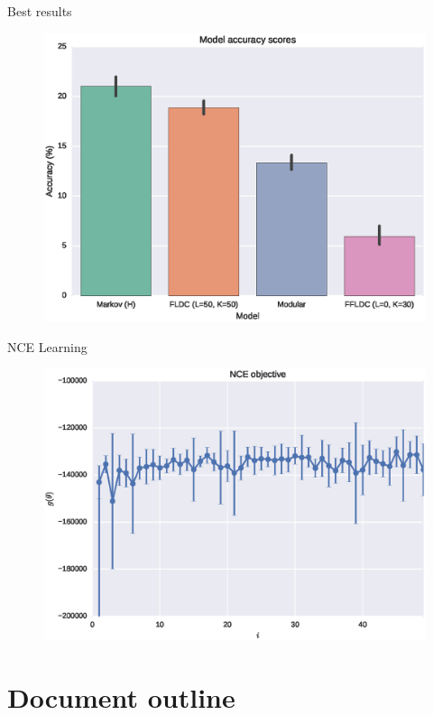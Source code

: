 \documentclass{beamer}
\begin{document}
\begin{frame}{Best results}
  \begin{figure}
    \centering
    \includegraphics[height=0.8\textheight]{score_100_no_singles_with_features}
  \end{figure}
\end{frame}

\begin{frame}{NCE Learning}
  \begin{figure}
    \centering
    \includegraphics[height=0.8\textheight]{100_no_singles_features_objective}
  \end{figure}
\end{frame}

\section{Document outline}
\end{document}
